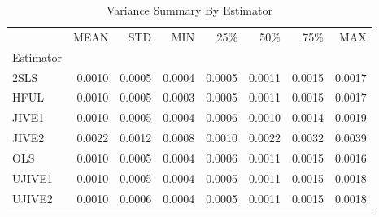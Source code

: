 \begin{table}[ht]
\centering
\caption{Variance Summary By Estimator}
\begin{tabular}{lrrrrrrr}
\toprule
 & MEAN & STD & MIN & 25\% & 50\% & 75\% & MAX \\
Estimator &  &  &  &  &  &  &  \\
\midrule
2SLS & 0.0010 & 0.0005 & 0.0004 & 0.0005 & 0.0011 & 0.0015 & 0.0017 \\
HFUL & 0.0010 & 0.0005 & 0.0003 & 0.0005 & 0.0011 & 0.0015 & 0.0017 \\
JIVE1 & 0.0010 & 0.0005 & 0.0004 & 0.0006 & 0.0010 & 0.0014 & 0.0019 \\
JIVE2 & 0.0022 & 0.0012 & 0.0008 & 0.0010 & 0.0022 & 0.0032 & 0.0039 \\
OLS & 0.0010 & 0.0005 & 0.0004 & 0.0006 & 0.0011 & 0.0015 & 0.0016 \\
UJIVE1 & 0.0010 & 0.0005 & 0.0004 & 0.0005 & 0.0011 & 0.0015 & 0.0018 \\
UJIVE2 & 0.0010 & 0.0006 & 0.0004 & 0.0005 & 0.0011 & 0.0015 & 0.0018 \\
\bottomrule
\end{tabular}
\end{table}
